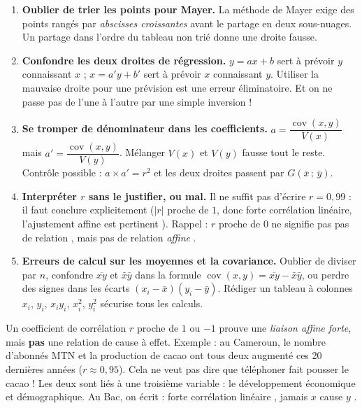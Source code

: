 \documentclass[11pt]{article}
\begin{document}
\begin{attention}
\begin{enumerate}
\item \textbf{Oublier de trier les points pour Mayer.} La méthode de Mayer exige des points rangés par \emph{abscisses croissantes} avant le partage en deux sous-nuages. Un partage dans l'ordre du tableau non trié donne une droite fausse.
\item \textbf{Confondre les deux droites de régression.} $y=ax+b$ sert à prévoir $y$ connaissant $x$ ; $x=a'y+b'$ sert à prévoir $x$ connaissant $y$. Utiliser la mauvaise droite pour une prévision est une erreur éliminatoire. Et on ne passe pas de l'une à l'autre par une simple inversion !
\item \textbf{Se tromper de dénominateur dans les coefficients.} $a=\dfrac{\operatorname{cov}(x,y)}{V(x)}$ mais $a'=\dfrac{\operatorname{cov}(x,y)}{V(y)}$. Mélanger $V(x)$ et $V(y)$ fausse tout le reste. Contrôle possible : $a\times a'=r^2$ et les deux droites passent par $G(\bar{x}\,;\,\bar{y})$.
\item \textbf{Interpréter $r$ sans le justifier, ou mal.} Il ne suffit pas d'écrire \og $r=0{,}99$ \fg{} : il faut conclure explicitement (\og $|r|$ proche de $1$, donc forte corrélation linéaire, l'ajustement affine est pertinent \fg). Rappel : $r$ proche de $0$ ne signifie pas \og pas de relation \fg, mais \og pas de relation \emph{affine} \fg.
\item \textbf{Erreurs de calcul sur les moyennes et la covariance.} Oublier de diviser par $n$, confondre $\overline{xy}$ et $\bar{x}\bar{y}$ dans la formule $\operatorname{cov}(x,y)=\overline{xy}-\bar{x}\bar{y}$, ou perdre des signes dans les écarts $(x_i-\bar{x})(y_i-\bar{y})$. Rédiger un tableau à colonnes $x_i$, $y_i$, $x_iy_i$, $x_i^2$, $y_i^2$ sécurise tous les calculs.
\end{enumerate}
\end{attention}

\begin{savaistu}
Un coefficient de corrélation $r$ proche de $1$ ou $-1$ prouve une \emph{liaison affine forte}, mais \textbf{pas} une relation de cause à effet. Exemple : au Cameroun, le nombre d'abonnés MTN et la production de cacao ont tous deux augmenté ces 20 dernières années ($r\approx 0,95$). Cela ne veut pas dire que téléphoner fait pousser le cacao ! Les deux sont liés à une troisième variable : le développement économique et démographique. Au Bac, on écrit : \og forte corrélation linéaire \fg, jamais \og $x$ cause $y$ \fg.
\end{savaistu}
\end{document}
